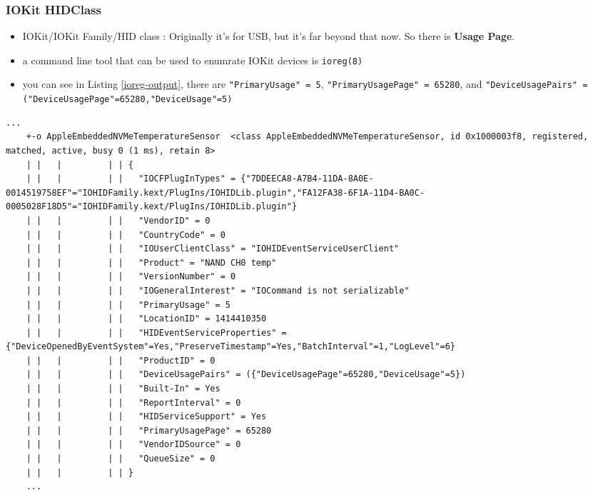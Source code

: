 \documentclass{beamer}
\begin{document}
\begin{frame}
  \frametitle{IOKit HIDClass}
  \begin{itemize}
  \item IOKit/IOKit Family/HID class \cite{iokit:family}: Originally it's for USB, but it's far beyond that now. So there is \textbf{Usage Page}.
  \item a command line tool that can be used to enumrate IOKit devices is \texttt{ioreg(8)}
  \item you can see in Listing \ref{ioreg-output}, there are \texttt{"PrimaryUsage" = 5}, \texttt{"PrimaryUsagePage" = 65280}, and \texttt{"DeviceUsagePairs" = ({"DeviceUsagePage"=65280,"DeviceUsage"=5})}
  \end{itemize}
  
  \begin{adjustbox}{varwidth=\maxdimen,max width=\linewidth,keepaspectratio}
    \begin{lstlisting}[caption={Example TemperatureSensor in \texttt{ioreg} output}, label={ioreg-output}]
    ...
    +-o AppleEmbeddedNVMeTemperatureSensor  <class AppleEmbeddedNVMeTemperatureSensor, id 0x1000003f8, registered, matched, active, busy 0 (1 ms), retain 8>
    | |   |         | | {
    | |   |         | |   "IOCFPlugInTypes" = {"7DDEECA8-A7B4-11DA-8A0E-0014519758EF"="IOHIDFamily.kext/PlugIns/IOHIDLib.plugin","FA12FA38-6F1A-11D4-BA0C-0005028F18D5"="IOHIDFamily.kext/PlugIns/IOHIDLib.plugin"}
    | |   |         | |   "VendorID" = 0
    | |   |         | |   "CountryCode" = 0
    | |   |         | |   "IOUserClientClass" = "IOHIDEventServiceUserClient"
    | |   |         | |   "Product" = "NAND CH0 temp"
    | |   |         | |   "VersionNumber" = 0
    | |   |         | |   "IOGeneralInterest" = "IOCommand is not serializable"
    | |   |         | |   "PrimaryUsage" = 5
    | |   |         | |   "LocationID" = 1414410350
    | |   |         | |   "HIDEventServiceProperties" = {"DeviceOpenedByEventSystem"=Yes,"PreserveTimestamp"=Yes,"BatchInterval"=1,"LogLevel"=6}
    | |   |         | |   "ProductID" = 0
    | |   |         | |   "DeviceUsagePairs" = ({"DeviceUsagePage"=65280,"DeviceUsage"=5})
    | |   |         | |   "Built-In" = Yes
    | |   |         | |   "ReportInterval" = 0
    | |   |         | |   "HIDServiceSupport" = Yes
    | |   |         | |   "PrimaryUsagePage" = 65280
    | |   |         | |   "VendorIDSource" = 0
    | |   |         | |   "QueueSize" = 0
    | |   |         | | }
    ...
    \end{lstlisting}
  \end{adjustbox}
\end{frame}
\end{document}

